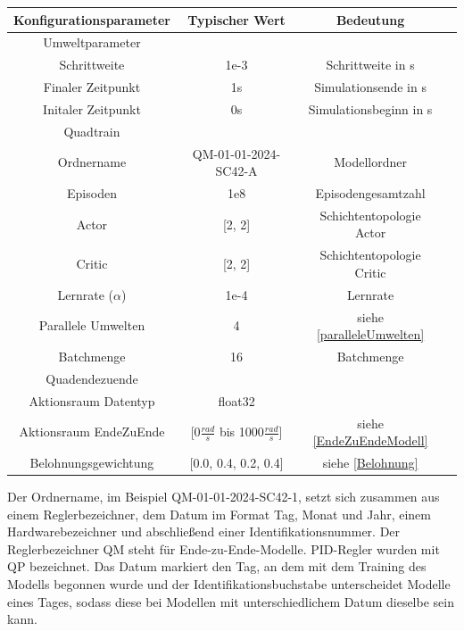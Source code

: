 \vspace*{0.5cm}
\begin{center}
	\begin{tabular}[h]{|c|c|c|c|}
		\hline 
		Konfigurationsparameter & Typischer Wert & Bedeutung\\
		\hline
		Umweltparameter & & \\
		Schrittweite & 1e-3 & Schrittweite in s\\
		Finaler Zeitpunkt & 1s & Simulationsende in s\\
		Initaler Zeitpunkt & 0s & Simulationsbeginn in s\\
		\hline 
		Quadtrain & & \\
		Ordnername & QM-01-01-2024-SC42-A & Modellordner\\ 
		Episoden & 1e8 & Episodengesamtzahl \\
		Actor & [2, 2] & Schichtentopologie Actor\\
		Critic & [2, 2] & Schichtentopologie Critic\\ 
		Lernrate ($\alpha$) & 1e-4 & Lernrate \\
		Parallele Umwelten & 4 & siehe \ref{paralleleUmwelten}\\
		Batchmenge & 16 & Batchmenge\\
		\hline 
		Quadendezuende & &\\
		Aktionsraum Datentyp & float32 &\\
		Aktionsraum EndeZuEnde & [0$\frac{rad}{s}$ bis 1000$\frac{rad}{s}$] & siehe \ref{EndeZuEndeModell}\\
		Belohnungsgewichtung & [0.0, 0.4, 0.2, 0.4] & siehe \ref{Belohnung}\\
		\hline
	\end{tabular}
\end{center}
Der Ordnername, im Beispiel QM-01-01-2024-SC42-1, setzt sich zusammen aus einem Reglerbezeichner, dem Datum im Format Tag, Monat und Jahr, einem Hardwarebezeichner und abschließend einer Identifikationsnummer. Der Reglerbezeichner QM steht für Ende-zu-Ende-Modelle. PID-Regler wurden mit QP bezeichnet. Das Datum markiert den Tag, an dem mit dem Training des Modells begonnen wurde und der Identifikationsbuchstabe unterscheidet Modelle eines Tages, sodass diese bei Modellen mit unterschiedlichem Datum dieselbe sein kann.

